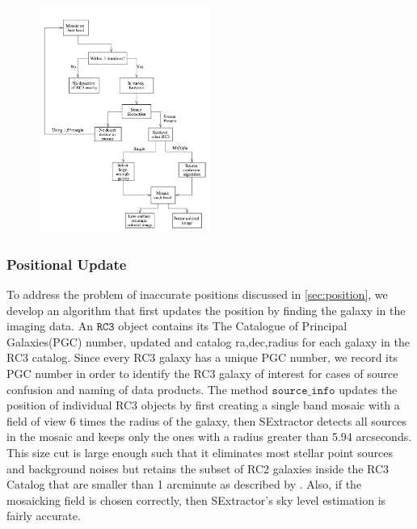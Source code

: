 \documentclass[authoryear, 12pt,5p, times]{elsarticle}
\begin{document}
\begin{figure}[h]
\includegraphics[width=0.5\textwidth]{figures/algorithm}
\end{figure}

\subsubsection{Positional Update} 

To address the problem of inaccurate positions discussed in \autoref{sec:position}, we develop an algorithm that first updates the position by finding the galaxy in the imaging data. An  $\texttt{RC3}$ object contains its The Catalogue of Principal Galaxies(PGC) number, updated and catalog ra,dec,radius for each galaxy in the RC3 catalog. Since every RC3 galaxy has a unique PGC number, we record  its PGC number in order to identify the RC3 galaxy of interest for cases of source confusion and naming of data products. The method $\texttt{source\_info}$ updates the position of individual RC3 objects by first creating a single band mosaic with a field of view 6 times the radius of the galaxy, then SExtractor detects all sources in the mosaic and keeps only the ones with a radius greater than 5.94 arcseconds. This size cut is large enough such that it eliminates most stellar point sources and background noises  but retains the subset of RC2 galaxies inside the RC3 Catalog that are smaller than 1 arcminute as described by \citealp{rc2}. Also, if the mosaicking field is chosen correctly, then SExtractor's sky level estimation is fairly accurate.  
\end{document}
